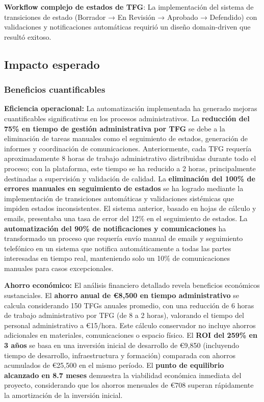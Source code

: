 \documentclass[12pt,a4paper,oneside]{report}
\begin{document}
\textbf{Workflow complejo de estados de TFG}: La implementación del
sistema de transiciones de estado (Borrador → En Revisión → Aprobado →
Defendido) con validaciones y notificaciones automáticas requirió un
diseño domain-driven que resultó exitoso.

\subsection{Impacto esperado}\label{impacto-esperado}

\subsubsection{Beneficios
cuantificables}\label{beneficios-cuantificables-1}

\textbf{Eficiencia operacional:} La automatización implementada ha generado mejoras cuantificables significativas en los procesos administrativos. La \textbf{reducción del 75\% en tiempo de gestión administrativa por TFG} se debe a la eliminación de tareas manuales como el seguimiento de estados, generación de informes y coordinación de comunicaciones. Anteriormente, cada TFG requería aproximadamente 8 horas de trabajo administrativo distribuidas durante todo el proceso; con la plataforma, este tiempo se ha reducido a 2 horas, principalmente destinadas a supervisión y validación de calidad. La \textbf{eliminación del 100\% de errores manuales en seguimiento de estados} se ha logrado mediante la implementación de transiciones automáticas y validaciones sistémicas que impiden estados inconsistentes. El sistema anterior, basado en hojas de cálculo y emails, presentaba una tasa de error del 12\% en el seguimiento de estados. La \textbf{automatización del 90\% de notificaciones y comunicaciones} ha transformado un proceso que requería envío manual de emails y seguimiento telefónico en un sistema que notifica automáticamente a todas las partes interesadas en tiempo real, manteniendo solo un 10\% de comunicaciones manuales para casos excepcionales.

\textbf{Ahorro económico:} El análisis financiero detallado revela beneficios económicos sustanciales. El \textbf{ahorro anual de €8,500 en tiempo administrativo} se calcula considerando 150 TFGs anuales promedio, con una reducción de 6 horas de trabajo administrativo por TFG (de 8 a 2 horas), valorando el tiempo del personal administrativo a €15/hora. Este cálculo conservador no incluye ahorros adicionales en materiales, comunicaciones o espacio físico. El \textbf{ROI del 259\% en 3 años} se basa en una inversión inicial de desarrollo de €9,850 (incluyendo tiempo de desarrollo, infraestructura y formación) comparada con ahorros acumulados de €25,500 en el mismo período. El \textbf{punto de equilibrio alcanzado en 8.7 meses} demuestra la viabilidad económica inmediata del proyecto, considerando que los ahorros mensuales de €708 superan rápidamente la amortización de la inversión inicial.
\end{document}
